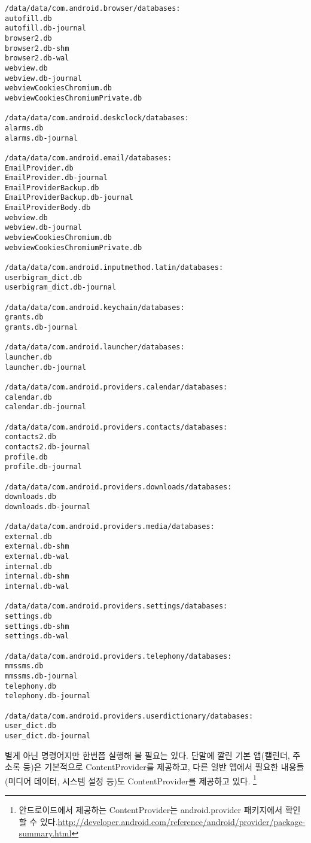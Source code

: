 \begin{lstlisting}[frame=single] 
/data/data/com.android.browser/databases:
autofill.db
autofill.db-journal
browser2.db
browser2.db-shm
browser2.db-wal
webview.db
webview.db-journal
webviewCookiesChromium.db
webviewCookiesChromiumPrivate.db

/data/data/com.android.deskclock/databases:
alarms.db
alarms.db-journal

/data/data/com.android.email/databases:
EmailProvider.db
EmailProvider.db-journal
EmailProviderBackup.db
EmailProviderBackup.db-journal
EmailProviderBody.db
webview.db
webview.db-journal
webviewCookiesChromium.db
webviewCookiesChromiumPrivate.db

/data/data/com.android.inputmethod.latin/databases:
userbigram_dict.db
userbigram_dict.db-journal

/data/data/com.android.keychain/databases:
grants.db
grants.db-journal

/data/data/com.android.launcher/databases:
launcher.db
launcher.db-journal

/data/data/com.android.providers.calendar/databases:
calendar.db
calendar.db-journal

/data/data/com.android.providers.contacts/databases:
contacts2.db
contacts2.db-journal
profile.db
profile.db-journal

/data/data/com.android.providers.downloads/databases:
downloads.db
downloads.db-journal

/data/data/com.android.providers.media/databases:
external.db
external.db-shm
external.db-wal
internal.db
internal.db-shm
internal.db-wal

/data/data/com.android.providers.settings/databases:
settings.db
settings.db-shm
settings.db-wal

/data/data/com.android.providers.telephony/databases:
mmssms.db
mmssms.db-journal
telephony.db
telephony.db-journal

/data/data/com.android.providers.userdictionary/databases:
user_dict.db
user_dict.db-journal
\end{lstlisting}
별게 아닌 명령어지만 한번쯤 실행해 볼 필요는 있다. 
단말에 깔린 기본 앱(캘린더, 주소록 등)은 기본적으로 ContentProvider를 제공하고, 다른 일반 앱에서 필요한 내용들(미디어 데이터, 시스템 설정 등)도 ContentProvider를 제공하고 있다.
\footnote{안드로이드에서 제공하는 ContentProvider는 android.provider 패키지에서 확인할 수 있다.\url{http://developer.android.com/reference/android/provider/package-summary.html}}\\

